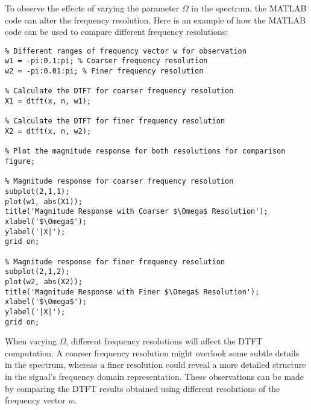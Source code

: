 
\item[(c)]
To observe the effects of varying the parameter $\Omega$ in the spectrum, the MATLAB code can alter the frequency resolution. Here is an example of how the MATLAB code can be used to compare different frequency resolutions:

\begin{verbatim}
% Different ranges of frequency vector w for observation
w1 = -pi:0.1:pi; % Coarser frequency resolution
w2 = -pi:0.01:pi; % Finer frequency resolution

% Calculate the DTFT for coarser frequency resolution
X1 = dtft(x, n, w1);

% Calculate the DTFT for finer frequency resolution
X2 = dtft(x, n, w2);

% Plot the magnitude response for both resolutions for comparison
figure;

% Magnitude response for coarser frequency resolution
subplot(2,1,1);
plot(w1, abs(X1));
title('Magnitude Response with Coarser $\Omega$ Resolution');
xlabel('$\Omega$');
ylabel('|X|');
grid on;

% Magnitude response for finer frequency resolution
subplot(2,1,2);
plot(w2, abs(X2));
title('Magnitude Response with Finer $\Omega$ Resolution');
xlabel('$\Omega$');
ylabel('|X|');
grid on;
\end{verbatim}

When varying $\Omega$, different frequency resolutions will affect the DTFT computation.
A coarser frequency resolution might overlook some subtle details in the spectrum,
whereas a finer resolution could reveal a more detailed structure in the signal's frequency domain representation.
These observations can be made by comparing the DTFT results obtained using different resolutions of the frequency vector $w$.
